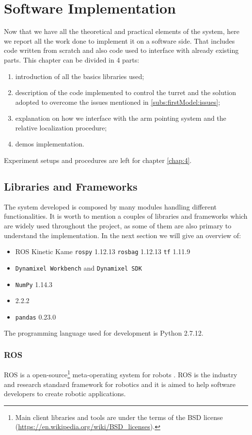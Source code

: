 \chapter{Software Implementation}\label{chap:3}
Now that we have all the theoretical and practical elements of the system, here we report all the work done to implement it on a software side. That includes code written from scratch and also code used to interface with already existing parts. This chapter can be divided in 4 parts:
\begin{enumerate}
    \item introduction of all the basics libraries used;
    \item description of the code implemented to control the turret and the solution adopted to overcome the issues mentioned in \ref{subs:firstModel:issues};
    \item explanation on how we interface with the arm pointing system and the relative localization procedure;
    \item demos implementation.
\end{enumerate}
Experiment setups and procedures are left for chapter \ref{chap:4}.

\section{Libraries and Frameworks}
The system developed is composed by many modules handling different functionalities. It is worth to mention a couples of libraries and frameworks which are widely used throughout the project, as some of them are also primary to understand the implementation. In the next section we will give an overview of:
\begin{itemize}
	\item \ac{ROS} Kinetic Kame
	\subitem \texttt{rospy} 1.12.13
	\subitem \texttt{rosbag} 1.12.13
	\subitem \texttt{tf} 1.11.9
	\item \texttt{Dynamixel Workbench} and \texttt{Dynamixel SDK}
	\item \texttt{NumPy} 1.14.3
	\item {} 2.2.2
	\item \texttt{pandas} 0.23.0
\end{itemize}
The programming language used for development is Python 2.7.12.\\

\subsection{\acf{ROS}}
\ac{ROS} is a open-source\footnote{Main client libraries and tools are under the terms of the BSD license (\url{https://en.wikipedia.org/wiki/BSD_licenses}).} meta-operating system for robots \cite{ros}. \ac{ROS} is the industry and research standard framework for robotics and it is aimed to help software developers to  create robotic applications.\\

